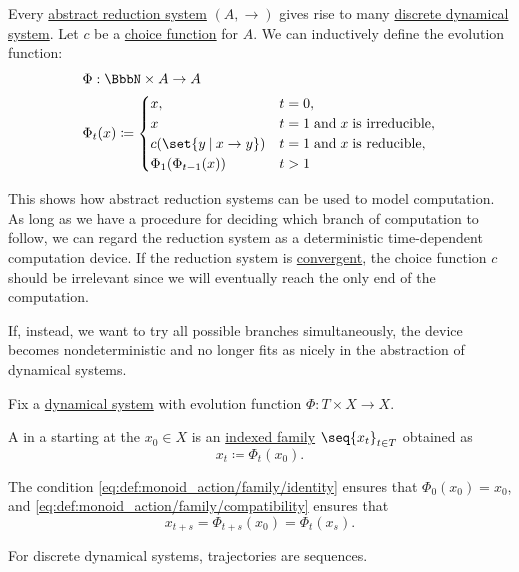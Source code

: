 \begin{example}\label{ex:abstract_reductions_as_dynamical_systems}
  Every \hyperref[def:abstract_reduction_system]{abstract reduction system} \( (A, \to) \) gives rise to many \hyperref[def:dynamical_system]{discrete dynamical system}. Let \( c \) be a \hyperref[def:choice_function]{choice function} for \( A \). We can inductively define the evolution function:
  \begin{equation*}
    \begin{aligned}
      &\Phi: \BbbN \times A \to A \\
      &\Phi_t(x) \coloneqq \begin{cases}
        x,                          &t = 0, \\
        x                           &t = 1 \T{and} x \T{is irreducible}, \\
        c(\set{ y \given x \to y }) &t = 1 \T{and} x \T{is reducible}, \\
        \Phi_1(\Phi_{t-1}(x))       &t > 1
      \end{cases}
    \end{aligned}
  \end{equation*}

  This shows how abstract reduction systems can be used to model computation. As long as we have a procedure for deciding which branch of computation to follow, we can regard the reduction system as a deterministic time-dependent computation device. If the reduction system is \hyperref[def:abstract_rewriting_convergence/convergent]{convergent}, the choice function \( c \) should be irrelevant since we will eventually reach the only end of the computation.

  If, instead, we want to try all possible branches simultaneously, the device becomes nondeterministic and no longer fits as nicely in the abstraction of dynamical systems.
\end{example}

\begin{definition}\label{def:dynamical_system_trajectory}
  Fix a \hyperref[def:dynamical_system]{dynamical system} with evolution function \( \Phi: T \times X \to X \).

  A  in a starting at the  \( x_0 \in X \) is an \hyperref[def:cartesian_product/indexed_family]{indexed family} \( \seq{ x_t }_{t \in T} \) obtained as
  \begin{equation*}
    x_t \coloneqq \Phi_t(x_0).
  \end{equation*}

  The condition \ref{eq:def:monoid_action/family/identity} ensures that \( \Phi_0(x_0) = x_0 \), and \ref{eq:def:monoid_action/family/compatibility} ensures that
  \begin{equation*}
    x_{t + s}
    =
    \Phi_{t + s}(x_0)
    =
    \Phi_t(x_s).
  \end{equation*}

  For discrete dynamical systems, trajectories are sequences.
\end{definition}

